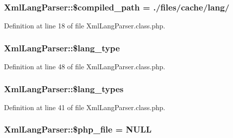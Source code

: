 \subsubsection[{\texorpdfstring{\$compiled\+\_\+path}{$compiled_path}}]{\setlength{\rightskip}{0pt plus 5cm}Xml\+Lang\+Parser\+::\$compiled\+\_\+path = \textquotesingle{}./{\bf files}/cache/{\bf lang}/\textquotesingle{}}\hypertarget{classXmlLangParser_af56d412775229f27848e533873fe94f3}{}\label{classXmlLangParser_af56d412775229f27848e533873fe94f3}


Definition at line 18 of file Xml\+Lang\+Parser.\+class.\+php.

\subsubsection[{\texorpdfstring{\$lang\+\_\+type}{$lang_type}}]{\setlength{\rightskip}{0pt plus 5cm}Xml\+Lang\+Parser\+::\$lang\+\_\+type}\hypertarget{classXmlLangParser_ac1289e1d349c8e40ef4afd26941cba5d}{}\label{classXmlLangParser_ac1289e1d349c8e40ef4afd26941cba5d}


Definition at line 48 of file Xml\+Lang\+Parser.\+class.\+php.

\subsubsection[{\texorpdfstring{\$lang\+\_\+types}{$lang_types}}]{\setlength{\rightskip}{0pt plus 5cm}Xml\+Lang\+Parser\+::\$lang\+\_\+types}\hypertarget{classXmlLangParser_a0385e815b92b65f3b3d12a29e54d1e36}{}\label{classXmlLangParser_a0385e815b92b65f3b3d12a29e54d1e36}


Definition at line 41 of file Xml\+Lang\+Parser.\+class.\+php.

\subsubsection[{\texorpdfstring{\$php\+\_\+file}{$php_file}}]{\setlength{\rightskip}{0pt plus 5cm}Xml\+Lang\+Parser\+::\$php\+\_\+file = N\+U\+LL}\hypertarget{classXmlLangParser_a0f8639ef765df04b8c4e7903de4353bb}{}\label{classXmlLangParser_a0f8639ef765df04b8c4e7903de4353bb}


